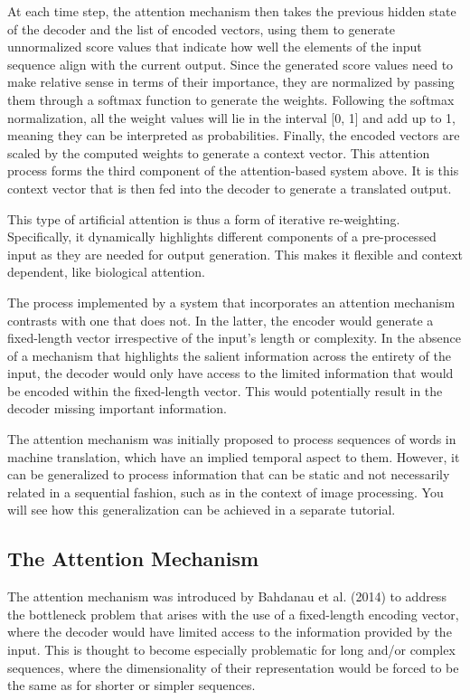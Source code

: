 \documentclass[10pt,a4paper]{article}
\begin{document}
At each time step, the attention mechanism then takes the previous hidden state of the decoder and the list of encoded vectors, using them to generate unnormalized score values that indicate how well the elements of the input sequence align with the current output. Since the generated score values need to make relative sense in terms of their importance, they are normalized by passing them through a softmax function to generate the weights. Following the softmax normalization, all the weight values will lie in the interval [0, 1] and add up to 1, meaning they can be interpreted as probabilities. Finally, the encoded vectors are scaled by the computed weights to generate a context vector. This attention process forms the third component of the attention-based system above. It is this context vector that is then fed into the decoder to generate a translated output. 

This type of artificial attention is thus a form of iterative re-weighting. Specifically, it dynamically highlights different components of a pre-processed input as they are needed for output generation. This makes it flexible and context dependent, like biological attention. 

The process implemented by a system that incorporates an attention mechanism contrasts with one that does not. In the latter, the encoder would generate a fixed-length vector irrespective of the input’s length or complexity. In the absence of a mechanism that highlights the salient information across the entirety of the input, the decoder would only have access to the limited information that would be encoded within the fixed-length vector. This would potentially result in the decoder missing important information. 

The attention mechanism was initially proposed to process sequences of words in machine translation, which have an implied temporal aspect to them. However, it can be generalized to process information that can be static and not necessarily related in a sequential fashion, such as in the context of image processing. You will see how this generalization can be achieved in a separate tutorial. 

\subsection{The Attention Mechanism}
The attention mechanism was introduced by Bahdanau et al. (2014) to address the bottleneck problem that arises with the use of a fixed-length encoding vector, where the decoder would have limited access to the information provided by the input. This is thought to become especially problematic for long and/or complex sequences, where the dimensionality of their representation would be forced to be the same as for shorter or simpler sequences.
\end{document}

